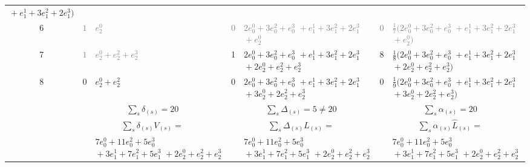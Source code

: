 \documentclass[11pt,a4paper]{article}
\newcommand{\eji}[2]{e^{#1}_{#2}}       %
\begin{document}
\begin{center}
\begin{tabular}{c|cp{3cm}|cp{3cm}|cp{3cm}}
    ${}+\eji{1}{1}+3\eji{2}{1}+2\eji{3}{1})$
   \\[3pt]
\rowcolor{gray!15}\cellcolor{white}6 & \textcolor{gray}{$1$} & \textcolor{gray}{$\eji{0}{2}$} & \textcolor{gray}{$0$}
  & \textcolor{gray}{$2\eji{0}{0}+3\eji{2}{0}+\eji{3}{0}$\newline
    ${}+\eji{1}{1}+3\eji{2}{1}+2\eji{3}{1}$\newline
    ${}+\eji{0}{2}$}
    & \textcolor{gray}{$0$}
 & \textcolor{gray}{$\tfrac 1 7 (2\eji{0}{0}+3\eji{2}{0}+\eji{3}{0}$\newline
    ${}+\eji{1}{1}+3\eji{2}{1}+2\eji{3}{1}$\newline
    ${}+\eji{0}{2})$}
     \\[3pt]
7 & \cellcolor{gray!15}\textcolor{gray}{$1$} & \cellcolor{gray!15}\textcolor{gray}{$\eji{0}{2}+\eji{2}{2}+\eji{3}{2}$} & 1
  & $2\eji{0}{0}+3\eji{2}{0}+\eji{3}{0}$\newline
    ${}+\eji{1}{1}+3\eji{2}{1}+2\eji{3}{1}$\newline
    ${}+2\eji{0}{2}+\eji{2}{2}+\eji{3}{2}$
    & 8
  & $\tfrac 1 8 (2\eji{0}{0}+3\eji{2}{0}+\eji{3}{0}$\newline
    ${}+\eji{1}{1}+3\eji{2}{1}+2\eji{3}{1}$\newline
    ${}+2\eji{0}{2}+\eji{2}{2}+\eji{3}{2})$
    \\[3pt]
8 & 0 & $\eji{0}{2}+\eji{2}{2}$ & 0
  & $2\eji{0}{0}+3\eji{2}{0}+\eji{3}{0}$\newline
    ${}+\eji{1}{1}+3\eji{2}{1}+2\eji{3}{1}$\newline
    ${}+3\eji{0}{2}+2\eji{2}{2}+\eji{3}{2}$
    & 0
  & $\tfrac 1 9 (2\eji{0}{0}+3\eji{2}{0}+\eji{3}{0}$\newline
    ${}+\eji{1}{1}+3\eji{2}{1}+2\eji{3}{1}$\newline
    ${}+3\eji{0}{2}+2\eji{2}{2}+\eji{3}{2})$
   \\
\midrule
&\multicolumn{2}{p{3.5cm}|}{$\sum_s \delta_{(s)}=20$}
  & \multicolumn{2}{p{3.5cm}|}{$\sum_s \Delta_{(s)}=5\ne 20$}
  & \multicolumn{2}{p{3.5cm}}{$\sum_s \alpha_{(s)}=20$}
  \\
     \midrule
& \multicolumn{2}{p{3.5cm}|}{
   $\sum_s \delta_{(s)} V_{(s)}=$}
  &\multicolumn{2}{p{3.5cm}|}{$
  \sum_s \Delta_{(s)} L_{(s)}=$}
  &\multicolumn{2}{p{3.5cm}}{$
  \sum_s \alpha_{(s)} {\hat L}_{(s)}=$}
   \\
&
&
   $7\eji{0}{0}+11\eji{2}{0}+5\eji{3}{0}$\newline
    ${}+3\eji{1}{1}+7\eji{2}{1}+5\eji{3}{1}$\newline
    ${}+2\eji{0}{2}+\eji{2}{2}+\eji{3}{2}$
  &
  &
  $7\eji{0}{0}+11\eji{2}{0}+5\eji{3}{0}$\newline
    ${}+3\eji{1}{1}+7\eji{2}{1}+5\eji{3}{1}$\newline
    ${}+2\eji{0}{2}+\eji{2}{2}+\eji{3}{2}$
  &
  & $7\eji{0}{0}+11\eji{2}{0}+5\eji{3}{0}$\newline
    ${}+3\eji{1}{1}+7\eji{2}{1}+5\eji{3}{1}$\newline
    ${}+2\eji{0}{2}+\eji{2}{2}+\eji{3}{2}$
  \\
\bottomrule
\end{tabular}
\end{center}
\end{document}
